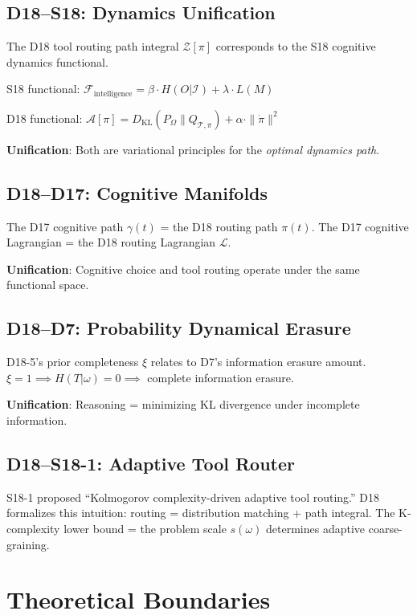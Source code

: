 \documentclass[12pt, a4paper]{article}
\newcommand{\KL}{D_{\mathrm{KL}}}
\begin{document}
\subsection{D18--S18: Dynamics Unification}

The D18 tool routing path integral $\mathcal{Z}[\pi]$ corresponds to the S18 cognitive dynamics functional.

S18 functional: $\mathcal{F}_{\text{intelligence}} = \beta \cdot H(O|\mathcal{I}) + \lambda \cdot L(M)$

D18 functional: $\mathcal{A}[\pi] = \KL(P_{\Omega} \| Q_{\mathcal{T},\pi}) + \alpha \cdot \|\dot{\pi}\|^2$

\textbf{Unification}: Both are variational principles for the \emph{optimal dynamics path}.

\subsection{D18--D17: Cognitive Manifolds}

The D17 cognitive path $\gamma(t)$ = the D18 routing path $\pi(t)$. The D17 cognitive Lagrangian = the D18 routing Lagrangian $\mathcal{L}$.

\textbf{Unification}: Cognitive choice and tool routing operate under the same functional space.

\subsection{D18--D7: Probability Dynamical Erasure}

D18-5's prior completeness $\xi$ relates to D7's information erasure amount. $\xi = 1 \implies H(T|\omega) = 0 \implies$ complete information erasure.

\textbf{Unification}: Reasoning = minimizing KL divergence under incomplete information.

\subsection{D18--S18-1: Adaptive Tool Router}

S18-1 proposed ``Kolmogorov complexity-driven adaptive tool routing.'' D18 formalizes this intuition: routing = distribution matching + path integral. The K-complexity lower bound = the problem scale $s(\omega)$ determines adaptive coarse-graining.

\section{Theoretical Boundaries}
\end{document}
